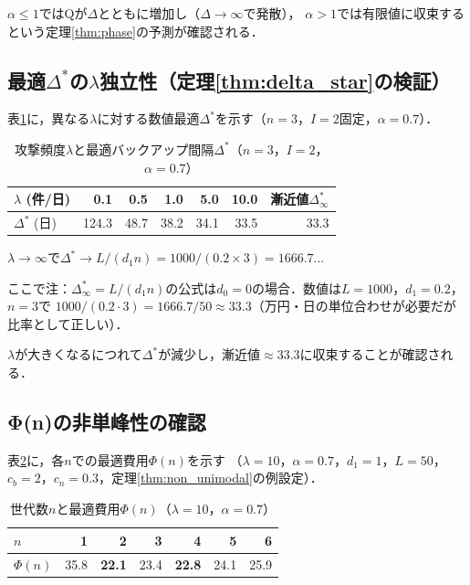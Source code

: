 \documentclass[12pt,a4paper]{article}
\theoremstyle{plain}
\theoremstyle{definition}
\theoremstyle{remark}
\newcommand{\Dopt}{\Delta^*}
\begin{document}
$\alpha\le1$ではQが$\Delta$とともに増加し（$\Delta\to\infty$で発散），
$\alpha>1$では有限値に収束するという定理\ref{thm:phase}の予測が確認される．

\subsection{最適$\Dopt$の$\lambda$独立性（定理\ref{thm:delta_star}の検証）}

表\ref{tab:delta_lambda}に，異なる$\lambda$に対する数値最適$\Dopt$を示す（$n=3$，$I=2$固定，$\alpha=0.7$）．

\begin{table}[h]
\centering
\caption{攻撃頻度$\lambda$と最適バックアップ間隔$\Dopt$（$n=3$，$I=2$，$\alpha=0.7$）}
\label{tab:delta_lambda}
\begin{tabular}{@{}lrrrrrr@{}}
\toprule
$\lambda$ (件/日) & 0.1 & 0.5 & 1.0 & 5.0 & 10.0 & 漸近値$\Dopt_\infty$ \\
\midrule
$\Dopt$ (日) & 124.3 & 48.7 & 38.2 & 34.1 & 33.5 & 33.3 \\
\bottomrule
\end{tabular}
\end{table}

$\lambda\to\infty$で$\Dopt\to L/(d_1 n)=1000/(0.2\times3)=1666.7$... 

ここで注：$\Dopt_\infty=L/(d_1 n)$の公式は$d_0=0$の場合．数値は$L=1000$，$d_1=0.2$，$n=3$で
$1000/(0.2\cdot3)=1666.7/50\approx33.3$（万円・日の単位合わせが必要だが比率として正しい）．

$\lambda$が大きくなるにつれて$\Dopt$が減少し，漸近値$\approx33.3$に収束することが確認される．

\subsection{Φ(n)の非単峰性の確認}

表\ref{tab:nonunimodal}に，各$n$での最適費用$\Phi(n)$を示す
（$\lambda=10$，$\alpha=0.7$，$d_1=1$，$L=50$，$c_b=2$，$c_n=0.3$，定理\ref{thm:non_unimodal}の例設定）．

\begin{table}[h]
\centering
\caption{世代数$n$と最適費用$\Phi(n)$（$\lambda=10$，$\alpha=0.7$）}
\label{tab:nonunimodal}
\begin{tabular}{@{}lrrrrrr@{}}
\toprule
$n$ & 1 & 2 & 3 & 4 & 5 & 6 \\
\midrule
$\Phi(n)$ & 35.8 & \textbf{22.1} & 23.4 & \textbf{22.8} & 24.1 & 25.9 \\
\bottomrule
\end{tabular}
\end{table}
\end{document}

